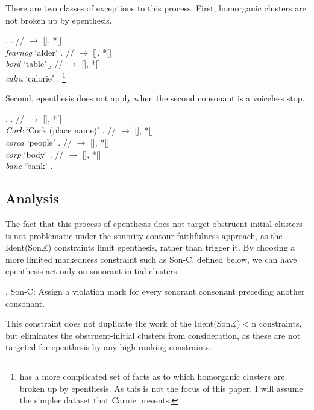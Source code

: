 \documentclass[12pt]{article}
\begin{document}
There are two classes of exceptions to this process.  First, homorganic clusters are not broken up by epenthesis.

\ex. \a. // $\rightarrow$ [], *[] \\
         {\it fearnog} `alder'
     \b. // $\rightarrow$ [], *[] \\
         {\it bord} `table'
     \b. // $\rightarrow$ [], *[] \\
         {\it calra} `calorie'  
     \z. 
     \citep[(52)]{carnie.1994}\footnote{\citet{ni.chiosain.1999} has a more complicated set of facts as to which homorganic clusters are broken up by epenthesis. As this is not the focus of this paper, I will assume the simpler dataset that Carnie presents.}

Second, epenthesis does not apply when the second consonant is a voiceless stop.

\ex. \a. // $\rightarrow$ [], *[] \\
         {\it Cork} `Cork (place name)' 
     \b. // $\rightarrow$ [], *[] \\
         {\it corca} `people' 
     \b. //  $\rightarrow$ [], *[] \\
         {\it corp} `body' 
     \b. // $\rightarrow$ [], *[] \\
         {\it banc} `bank'
     \z.
     \citep[(39a,b,c,26c)]{carnie.1994}

\subsection{Analysis}

The fact that this process of epenthesis does not target obstruent-initial clusters is not problematic under the sonority contour faithfulness approach,
as the {\sc Ident(Son$\measuredangle$)} constraints limit epenthesis, rather than trigger it.  By choosing a more limited markedness constraint such as {\sc *Son-C},
defined below, we can have epenthesis act only on sonorant-initial clusters.

\ex. {\sc *Son-C}: Assign a violation mark for every sonorant consonant preceding another consonant.

This constraint does not duplicate the work of the {\sc Ident(Son$\measuredangle$)}$<$n constraints, but eliminates the obstruent-initial clusters from consideration, as these are not targeted for epenthesis by any high-ranking constraints.
\end{document}
